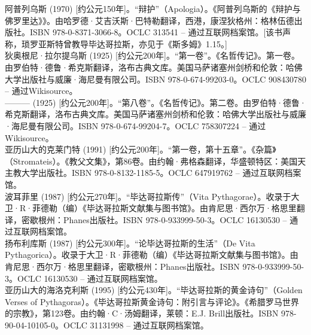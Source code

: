 阿普列乌斯 (1970) [约公元150年]。“辩护”（Apologia）。《阿普列乌斯的《辩护与佛罗里达》》。由哈罗德·艾吉沃斯·巴特勒翻译，西港，康涅狄格州：格林伍德出版社。ISBN 978-0-8371-3066-8。OCLC 313541 – 通过互联网档案馆。[该书声称，琐罗亚斯特曾教导毕达哥拉斯，亦见于《斯多姆》1.15。]\\
狄奥根尼·拉尔提乌斯 (1925) [约公元200年]。“第一卷”。《名哲传记》。第一卷。由罗伯特·德鲁·希克斯翻译，洛布古典文库。美国马萨诸塞州剑桥和伦敦：哈佛大学出版社与威廉·海尼曼有限公司。ISBN 978-0-674-99203-0。OCLC 908430780 – 通过Wikisource。\\
——— (1925) [约公元200年]。“第八卷”。《名哲传记》。第二卷。由罗伯特·德鲁·希克斯翻译，洛布古典文库。美国马萨诸塞州剑桥和伦敦：哈佛大学出版社与威廉·海尼曼有限公司。ISBN 978-0-674-99204-7。OCLC 758307224 – 通过Wikisource。\\
亚历山大的克莱门特 (1991) [约公元200年]。“第一卷，第十五章”。《杂篇》（Stromateis）。《教父文集》，第86卷。由约翰·弗格森翻译，华盛顿特区：美国天主教大学出版社。ISBN 978-0-8132-1185-5。OCLC 647919762 – 通过互联网档案馆。\\
波耳菲里 (1987) [约公元270年]。“毕达哥拉斯传”（Vita Pythagorae）。收录于大卫·R·菲德勒（编）《毕达哥拉斯文献集与图书馆》。由肯尼思·西尔万·格思里翻译，密歇根州：Phanes出版社。ISBN 978-0-933999-50-3。OCLC 16130530 – 通过互联网档案馆。\\
扬布利库斯 (1987) [约公元300年]。“论毕达哥拉斯的生活”（De Vita Pythagorica）。收录于大卫·R·菲德勒（编）《毕达哥拉斯文献集与图书馆》。由肯尼思·西尔万·格思里翻译，密歇根州：Phanes出版社。ISBN 978-0-933999-50-3。OCLC 16130530 – 通过互联网档案馆。\\
亚历山大的海洛克利斯 (1995) [约公元430年]。“毕达哥拉斯的黄金诗句”（Golden Verses of Pythagoras）。《毕达哥拉斯黄金诗句：附引言与评论》。《希腊罗马世界的宗教》，第123卷。由约翰·C·汤姆翻译，莱顿：E.J. Brill出版社。ISBN 978-90-04-10105-0。OCLC 31131998 – 通过互联网档案馆。

